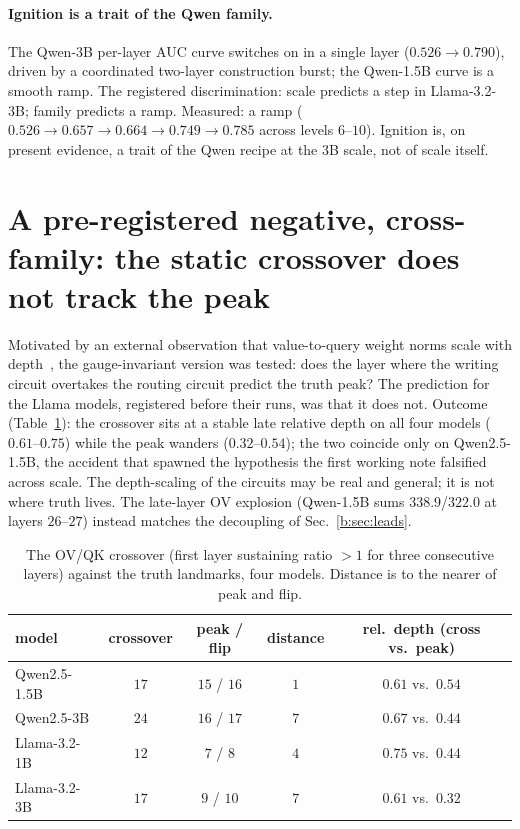 \documentclass[11pt]{article}
\begin{document}
\paragraph{Ignition is a trait of the Qwen family.} The Qwen-3B per-layer
AUC curve switches on in a single layer ($0.526 \to 0.790$), driven by a
coordinated two-layer construction burst; the Qwen-1.5B curve is a smooth
ramp. The registered discrimination: scale predicts a step in Llama-3.2-3B;
family predicts a ramp. Measured: a ramp ($0.526 \to 0.657 \to 0.664 \to
0.749 \to 0.785$ across levels $6$--$10$). Ignition is, on present
evidence, a trait of the Qwen recipe at the 3B scale, not of scale itself.

\section{A pre-registered negative, cross-family: the static crossover does not track the peak}
\label{b:sec:negatives}

Motivated by an external observation that value-to-query weight norms scale
with depth~\cite{headgenome}, the gauge-invariant version was tested: does
the layer where the writing circuit overtakes the routing circuit predict
the truth peak? The prediction for the Llama models, registered before
their runs, was that it does not. Outcome (Table~\ref{b:tab:crossover}): the
crossover sits at a stable late relative depth on all four models
($0.61$--$0.75$) while the peak wanders ($0.32$--$0.54$); the two coincide
only on Qwen2.5-1.5B, the accident that spawned the hypothesis the first
working note falsified across scale. The depth-scaling of the circuits may
be real and general; it is not where truth lives. The late-layer OV
explosion (Qwen-1.5B sums $338.9$/$322.0$ at layers $26$--$27$) instead
matches the decoupling of Sec.~\ref{b:sec:leads}.

\begin{table}[H]
\centering
\caption{The OV/QK crossover (first layer sustaining ratio $>1$ for three
consecutive layers) against the truth landmarks, four models. Distance is
to the nearer of peak and flip.}
\label{b:tab:crossover}
\begin{tabular}{lcccc}
\toprule
model & crossover & peak / flip & distance & rel.\ depth (cross vs.\ peak) \\
\midrule
Qwen2.5-1.5B & $17$ & $15$ / $16$ & $1$ & $0.61$ vs.\ $0.54$ \\
Qwen2.5-3B   & $24$ & $16$ / $17$ & $7$ & $0.67$ vs.\ $0.44$ \\
Llama-3.2-1B & $12$ & $7$ / $8$   & $4$ & $0.75$ vs.\ $0.44$ \\
Llama-3.2-3B & $17$ & $9$ / $10$  & $7$ & $0.61$ vs.\ $0.32$ \\
\bottomrule
\end{tabular}
\end{table}
\end{document}
